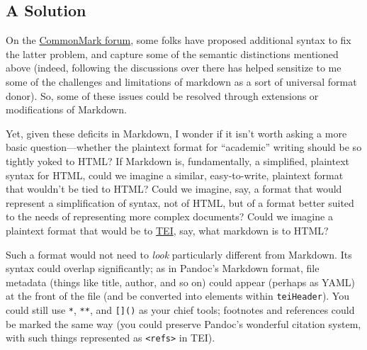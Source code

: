 \documentclass[
  12pt,
]{article}
\begin{document}
\hypertarget{a-solution}{%
\subsection{A Solution}\label{a-solution}}

On the \href{http://talk.commonmark.org/}{CommonMark forum}, some folks
have proposed additional syntax to fix the latter problem, and capture
some of the semantic distinctions mentioned above (indeed, following the
discussions over there has helped sensitize to me some of the challenges
and limitations of markdown as a sort of universal format donor). So,
some of these issues could be resolved through extensions or
modifications of Markdown.

Yet, given these deficits in Markdown, I wonder if it isn't worth asking
a more basic question---whether the plaintext format for ``academic''
writing should be so tightly yoked to HTML? If Markdown is,
fundamentally, a simplified, plaintext syntax for HTML, could we imagine
a similar, easy-to-write, plaintext format that wouldn't be tied to
HTML? Could we imagine, say, a format that would represent a
simplification of syntax, not of HTML, but of a format better suited to
the needs of representing more complex documents? Could we imagine a
plaintext format that would be to
\href{http://www.tei-c.org/index.xml}{TEI}, say, what markdown is to
HTML?

Such a format would not need to \emph{look} particularly different from
Markdown. Its syntax could overlap significantly; as in Pandoc's
Markdown format, file metadata (things like title, author, and so on)
could appear (perhaps as YAML) at the front of the file (and be
converted into elements within \texttt{teiHeader}). You could still use
\texttt{*}, \texttt{**}, and \texttt{{[}{]}()} as your chief tools;
footnotes and references could be marked the same way (you could
preserve Pandoc's wonderful citation system, with such things
represented as \texttt{\textless{}refs\textgreater{}} in TEI).
\end{document}
